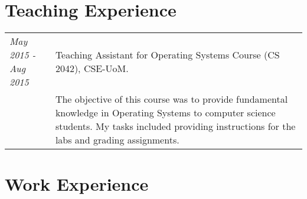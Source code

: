 \documentclass[a4paper,10pt]{article}
\begin{document}
\section{Teaching Experience}
\begin{tabular}{p{3cm}p{13.5cm}}

\emph{May 2015 - Aug 2015} & Teaching Assistant for Operating Systems Course (CS 2042), CSE-UoM.\\
&\footnotesize{The objective of this course was to provide fundamental knowledge in Operating Systems to computer science students. My tasks included providing instructions for the labs and grading assignments.}
\end{tabular}


\section{Work Experience}
\end{document}
